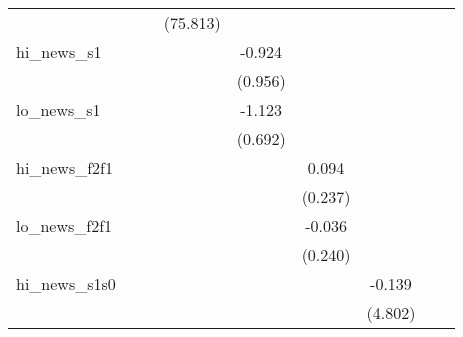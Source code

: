 {\begin{tabular}{l*{8}{c}}
            &                     &                     &    (75.813)         &                     &                     &                     &                     &                     \\
\addlinespace
hi\_news\_s1  &                     &                     &                     &      -0.924         &                     &                     &                     &                     \\
            &                     &                     &                     &     (0.956)         &                     &                     &                     &                     \\
\addlinespace
lo\_news\_s1  &                     &                     &                     &      -1.123         &                     &                     &                     &                     \\
            &                     &                     &                     &     (0.692)         &                     &                     &                     &                     \\
\addlinespace
hi\_news\_f2f1&                     &                     &                     &                     &       0.094         &                     &                     &                     \\
            &                     &                     &                     &                     &     (0.237)         &                     &                     &                     \\
\addlinespace
lo\_news\_f2f1&                     &                     &                     &                     &      -0.036         &                     &                     &                     \\
            &                     &                     &                     &                     &     (0.240)         &                     &                     &                     \\
\addlinespace
hi\_news\_s1s0&                     &                     &                     &                     &                     &      -0.139         &                     &                     \\
            &                     &                     &                     &                     &                     &     (4.802)         &                     &                     \\

\end{tabular}}
